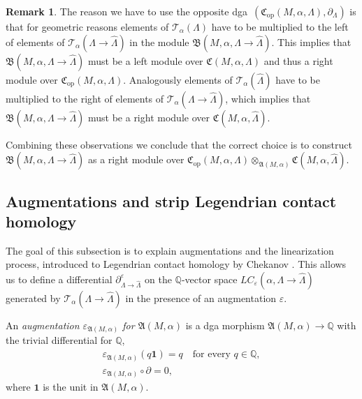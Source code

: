 \documentclass[10pt]{amsart}
\let\mathcal\mathscr
\let\epsilon\varepsilon
\let\ra\rightarrow
\newcommand{\opp}{\mathrm{op}}
\theoremstyle{plain}
\theoremstyle{definition}
\newtheorem{rmk}[thm]{Remark}
\numberwithin{equation}{subsection}
\newcommand{\QQ}{\mathbb{Q}}
\newcommand{\bdry}{\partial}
\begin{document}
\begin{rmk}
The reason we have to use the opposite dga~$(\mathfrak{C}_{\opp}(M,\alpha,\Lambda),\partial_\Lambda)$ is that for geometric reasons elements of $\mathcal{T}_\alpha(\Lambda)$ have to be multiplied to the left of elements of $\mathcal{T}_\alpha(\Lambda\ra\widehat{\Lambda})$ in the module $\mathfrak{B}(M,\alpha,\Lambda\ra\widehat{\Lambda})$. This implies that $\mathfrak{B}(M,\alpha,\Lambda\ra\widehat{\Lambda})$ must be a left module over $\mathfrak{C}(M,\alpha,{\Lambda})$ and thus a right module over $\mathfrak{C}_{\opp}(M,\alpha,{\Lambda})$.
Analogously elements of $\mathcal{T}_\alpha(\widehat{\Lambda})$ have to be multiplied to the right of elements of $\mathcal{T}_\alpha(\Lambda\ra\widehat{\Lambda})$, which implies that $\mathfrak{B}(M,\alpha,\Lambda\ra\widehat{\Lambda})$ must be a right module over $\mathfrak{C}(M,\alpha,\widehat{\Lambda})$.

Combining these observations we conclude that the correct choice is to construct $\mathfrak{B}(M,\alpha,\Lambda\ra\widehat{\Lambda})$ as a right module over $\mathfrak{C}_{\opp}(M,\alpha,\Lambda) \otimes_{\mathfrak{A}(M,\alpha)} \mathfrak{C}(M,\alpha,\widehat{\Lambda})$.
\end{rmk}

\subsection{Augmentations and strip Legendrian contact homology} \label{subsection: linearizations}

The goal of this subsection is to explain augmentations and the linearization process, introduced to Legendrian contact homology by Chekanov \cite{Ch}. This allows us to define a differential $\bdry^\epsilon_{\Lambda\ra\widehat{\Lambda}}$ on the $\mathbb{Q}$-vector space $LC_{\epsilon}(\alpha, \Lambda\ra\widehat{\Lambda})$ generated by $\mathcal{T}_\alpha(\Lambda\ra\widehat{\Lambda})$ in the presence of an augmentation $\epsilon$.

An {\em augmentation $\epsilon_{\mathfrak{A}(M,\alpha)}$ for $\mathfrak{A}(M,\alpha)$} is a dga morphism $\mathfrak{A}(M,\alpha)\to\mathbb{Q}$ with the trivial differential for $\QQ$, \ie
\begin{gather}
\epsilon_{\mathfrak{A}(M,\alpha)}(q\mathbf{1})= q \quad\mbox{for every } q \in \mathbb{Q},\\
\epsilon_{\mathfrak{A}(M,\alpha)} \circ \partial= 0,
\end{gather}
where $\mathbf{1}$ is the unit in $\mathfrak{A}(M,\alpha)$.
\end{document}
